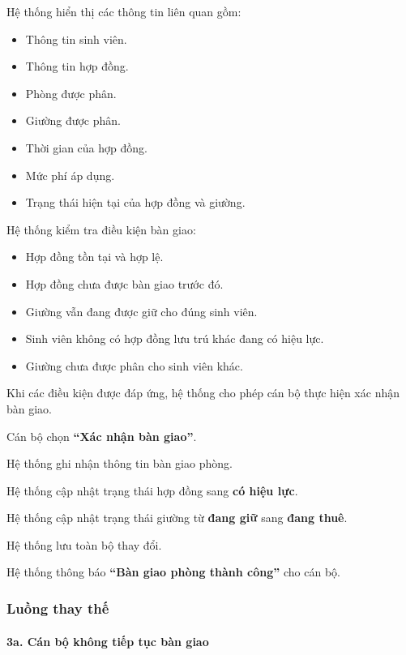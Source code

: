 Hệ thống hiển thị các thông tin liên quan gồm:

\begin{itemize}[leftmargin=1.4em]
\item Thông tin sinh viên.
\item Thông tin hợp đồng.
\item Phòng được phân.
\item Giường được phân.
\item Thời gian của hợp đồng.
\item Mức phí áp dụng.
\item Trạng thái hiện tại của hợp đồng và giường.
\end{itemize}

Hệ thống kiểm tra điều kiện bàn giao:

\begin{itemize}[leftmargin=1.4em]
\item Hợp đồng tồn tại và hợp lệ.
\item Hợp đồng chưa được bàn giao trước đó.
\item Giường vẫn đang được giữ cho đúng sinh viên.
\item Sinh viên không có hợp đồng lưu trú khác đang có hiệu lực.
\item Giường chưa được phân cho sinh viên khác.
\end{itemize}

Khi các điều kiện được đáp ứng, hệ thống cho phép cán bộ thực hiện xác nhận bàn giao.

Cán bộ chọn \textbf{“Xác nhận bàn giao”}.

Hệ thống ghi nhận thông tin bàn giao phòng.

Hệ thống cập nhật trạng thái hợp đồng sang \textbf{có hiệu lực}.

Hệ thống cập nhật trạng thái giường từ \textbf{đang giữ} sang \textbf{đang thuê}.

Hệ thống lưu toàn bộ thay đổi.

Hệ thống thông báo \textbf{“Bàn giao phòng thành công”} cho cán bộ.

\subsubsection{Luồng thay thế}

\paragraph{3a. Cán bộ không tiếp tục bàn giao}

